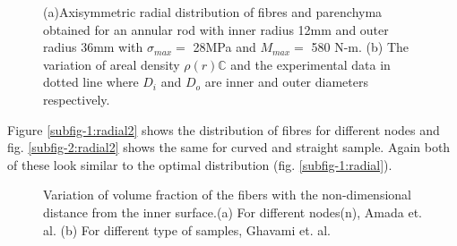 \documentclass[openright,twoside]{iitkthesis}
\begin{document}
\begin{figure}[H]
\begin{center}
{     }
\caption{(a)Axisymmetric radial distribution of fibres and parenchyma obtained for an annular rod with inner radius 12mm and outer radius 36mm with $\sigma_{max} = $ 28MPa and $M_{max} = $ 580 N-m. (b) The variation of areal density $\rho(r)\mathbb{C}$ and the experimental data in dotted line where $D_i$ and $D_o$ are inner and outer diameters respectively. \cite{mannan2017correlations}}
\label{fig:radial}
\end{center}
\end{figure}
Figure \ref{subfig-1:radial2} shows the distribution of fibres for different nodes and fig. \ref{subfig-2:radial2} shows the same for curved and straight sample. Again both of these look similar to the optimal distribution (fig. \ref{subfig-1:radial}). 
\begin{figure}[H]
\begin{center}
	\caption{Variation of volume fraction of the fibers with the non-dimensional distance from the inner surface.(a) For different nodes(n), Amada et. al. \cite{amada1996mechanical} (b) For different type of samples, Ghavami et. al. \cite{ghavami2003bamboo}}
\label{fig:radial2}
\end{center}
\end{figure}
\end{document}
